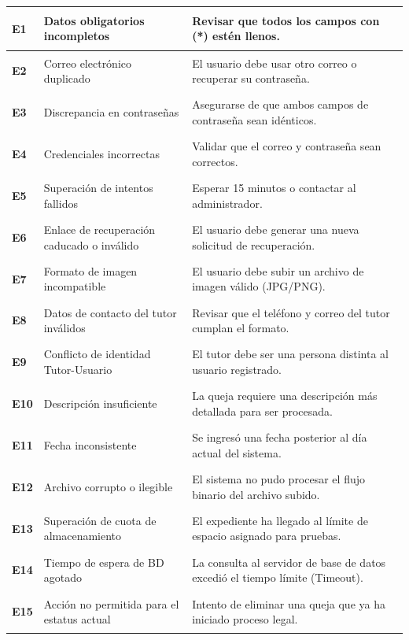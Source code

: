 \begin{longtable}{|p{2cm}|p{6cm}|p{6cm}|}
    \hypertarget{err:E1}{\textbf{E1}} & Datos obligatorios incompletos & Revisar que todos los campos con (*) estén llenos. \\ \hline
    \hypertarget{err:E2}{\textbf{E2}} & Correo electrónico duplicado & El usuario debe usar otro correo o recuperar su contraseña. \\ \hline
    \hypertarget{err:E3}{\textbf{E3}} & Discrepancia en contraseñas & Asegurarse de que ambos campos de contraseña sean idénticos. \\ \hline
    \hypertarget{err:E4}{\textbf{E4}} & Credenciales incorrectas & Validar que el correo y contraseña sean correctos. \\ \hline
    \hypertarget{err:E5}{\textbf{E5}} & Superación de intentos fallidos & Esperar 15 minutos o contactar al administrador. \\ \hline
    \hypertarget{err:E6}{\textbf{E6}} & Enlace de recuperación caducado o inválido & El usuario debe generar una nueva solicitud de recuperación. \\ \hline
    \hypertarget{err:E7}{\textbf{E7}} & Formato de imagen incompatible & El usuario debe subir un archivo de imagen válido (JPG/PNG). \\ \hline
    \hypertarget{err:E8}{\textbf{E8}} & Datos de contacto del tutor inválidos & Revisar que el teléfono y correo del tutor cumplan el formato. \\ \hline
    \hypertarget{err:E9}{\textbf{E9}} & Conflicto de identidad Tutor-Usuario & El tutor debe ser una persona distinta al usuario registrado. \\ \hline
    \hypertarget{err:E10}{\textbf{E10}} & Descripción insuficiente & La queja requiere una descripción más detallada para ser procesada. \\ \hline
    \hypertarget{err:E11}{\textbf{E11}} & Fecha inconsistente & Se ingresó una fecha posterior al día actual del sistema. \\ \hline
    \hypertarget{err:E12}{\textbf{E12}} & Archivo corrupto o ilegible & El sistema no pudo procesar el flujo binario del archivo subido. \\ \hline
    \hypertarget{err:E13}{\textbf{E13}} & Superación de cuota de almacenamiento & El expediente ha llegado al límite de espacio asignado para pruebas. \\ \hline
    \hypertarget{err:E14}{\textbf{E14}} & Tiempo de espera de BD agotado & La consulta al servidor de base de datos excedió el tiempo límite (Timeout). \\ \hline
    \hypertarget{err:E15}{\textbf{E15}} & Acción no permitida para el estatus actual & Intento de eliminar una queja que ya ha iniciado proceso legal. \\ \hline

\end{longtable}
